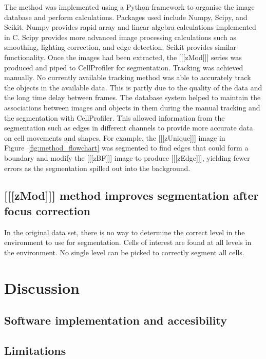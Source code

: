 \documentclass[preprint,11pt,5p,twocolumn]{elsarticle}
\begin{document}
The method was implemented using a Python framework to organise the image database and perform calculations. Packages used include Numpy, Scipy, and Scikit. Numpy provides rapid array and linear algebra calculations implemented in C. Scipy provides more advanced image processing calculations such as smoothing, lighting correction, and edge detection. Scikit provides similar functionality. Once the images had been extracted, the [[[zMod]]] series was produced and piped to CellProfiler for segmentation. Tracking was achieved manually. No currently available tracking method was able to accurately track the objects in the available data. This is partly due to the quality of the data and the long time delay between frames. The database system helped to maintain the associations between images and objects in them during the manual tracking and the segmentation with CellProfiler. This allowed information from the segmentation such as edges in different channels to provide more accurate data on cell movements and shapes. For example, the [[[zUnique]]] image in Figure~\ref{fig:method_flowchart} was segmented to find edges that could form a boundary and modify the [[[zBF]]] image to produce [[[zEdge]]], yielding fewer errors as the segmentation spilled out into the background.

\subsection{[[[zMod]]] method improves segmentation after focus correction}

In the original data set, there is no way to determine the correct level in the environment to use for segmentation. Cells of interest are found at all levels in the environment. No single level can be picked to correctly segment all cells. 

\section{Discussion}

\subsection{Software implementation and accesibility}
\subsection{Limitations}

\end{document}
